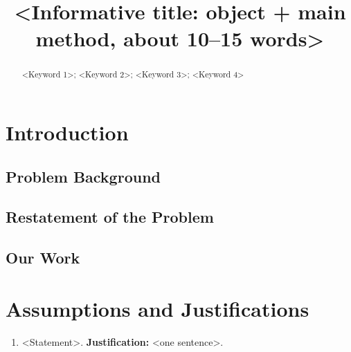 \documentclass{mcmthesis}
\title{<Informative title: object + main method, about 10--15 words>}
\author{}
\date{}
\begin{document}
\begin{abstract}
\AbstractPlaceholder %

\begin{keywords}
<Keyword 1>; <Keyword 2>; <Keyword 3>; <Keyword 4>
\end{keywords}
\end{abstract}
\maketitle

\tableofcontents
\newpage

\section{Introduction}
\subsection{Problem Background}
\subsection{Restatement of the Problem}
\subsection{Our Work}

\section{Assumptions and Justifications}
\begin{enumerate}[label=\textbf{Assumption \arabic*:}, leftmargin=*]
  \item <Statement>.
  \textbf{Justification:} <one sentence>.
\end{enumerate}
\end{document}
